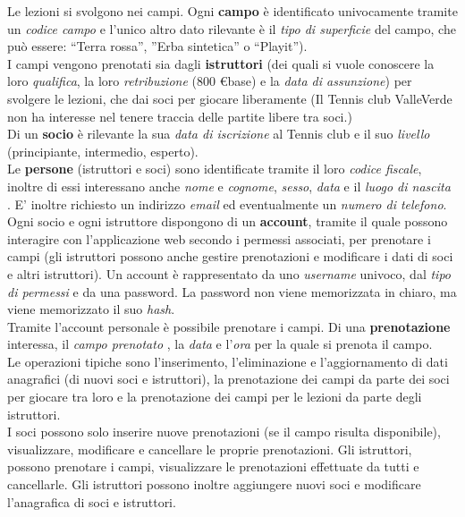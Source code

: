 Le lezioni si svolgono nei campi. Ogni \textbf{campo} è identificato univocamente tramite un \textit{codice campo} e l’unico altro dato rilevante è il \textit{tipo di superficie} del campo, che può essere: “Terra rossa”, ”Erba sintetica” o “Playit”). \\

I campi vengono prenotati sia dagli \textbf{istruttori} (dei quali si vuole conoscere la loro \textit{qualifica}, la loro \textit{retribuzione} (800 \euro base) e la \textit{data di assunzione}) per svolgere le lezioni, che dai soci per giocare liberamente (Il Tennis club ValleVerde non ha interesse nel tenere traccia delle partite libere tra soci.)\\

Di un \textbf{socio} è rilevante la sua \textit{data di iscrizione} al Tennis club e il suo \textit{livello} (principiante, intermedio, esperto).\\

Le \textbf{persone} (istruttori e soci) sono identificate tramite il loro \textit{codice fiscale}, inoltre di essi interessano anche \textit{nome} e \textit{cognome}, \textit{sesso}, \textit{data} e il \textit{luogo di nascita} . E’ inoltre richiesto un indirizzo \textit{email} ed eventualmente un \textit{numero di telefono}. \\

Ogni socio e ogni istruttore dispongono di un \textbf{account}, tramite il quale possono interagire con l’applicazione web secondo i permessi associati, per prenotare i campi (gli istruttori possono anche gestire prenotazioni e modificare i dati di soci e altri istruttori).
Un account è rappresentato da uno \textit{username} univoco, dal \textit{tipo di permessi} e da una password. La password non viene memorizzata in chiaro, ma viene memorizzato il suo \textit{hash}.\\

Tramite l’account personale è possibile prenotare i campi. Di una \textbf{prenotazione} interessa, il \textit{campo prenotato} , la \textit{data} e l'\textit{ora} per la quale si prenota il campo. \\

Le operazioni tipiche sono l’inserimento, l’eliminazione e l’aggiornamento di dati anagrafici (di nuovi soci e istruttori), la prenotazione dei campi da parte dei soci per giocare tra loro e la prenotazione dei campi per le lezioni da parte degli istruttori. \\

I soci possono solo inserire nuove prenotazioni (se il campo risulta disponibile), visualizzare, modificare e cancellare le proprie prenotazioni. 
Gli istruttori, possono prenotare i campi, visualizzare le prenotazioni effettuate da tutti e cancellarle.
Gli istruttori possono inoltre aggiungere nuovi soci e modificare l’anagrafica di soci e istruttori.


